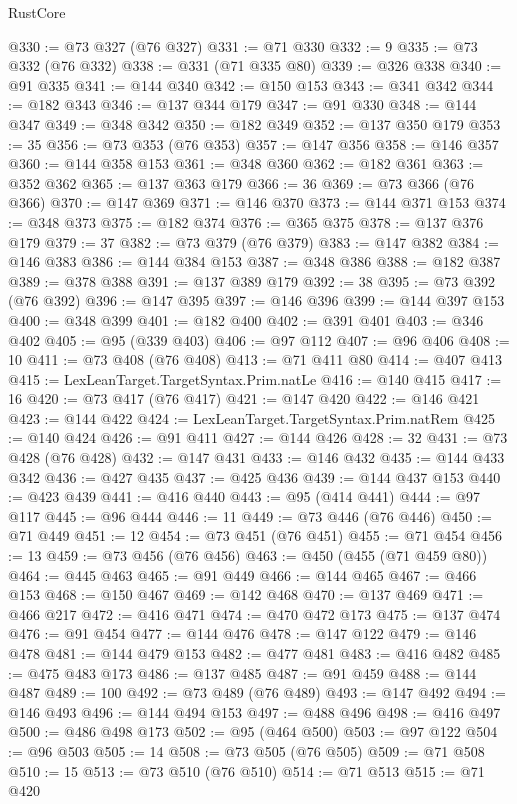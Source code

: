 \begin{lexlean}{RustCore}
\begin{coremodule}
@330 := @73 @327 (@76 @327)
@331 := @71 @330
@332 := 9
@335 := @73 @332 (@76 @332)
@338 := @331 (@71 @335 @80)
@339 := @326 @338
@340 := @91 @335
@341 := @144 @340
@342 := @150 @153
@343 := @341 @342
@344 := @182 @343
@346 := @137 @344 @179
@347 := @91 @330
@348 := @144 @347
@349 := @348 @342
@350 := @182 @349
@352 := @137 @350 @179
@353 := 35
@356 := @73 @353 (@76 @353)
@357 := @147 @356
@358 := @146 @357
@360 := @144 @358 @153
@361 := @348 @360
@362 := @182 @361
@363 := @352 @362
@365 := @137 @363 @179
@366 := 36
@369 := @73 @366 (@76 @366)
@370 := @147 @369
@371 := @146 @370
@373 := @144 @371 @153
@374 := @348 @373
@375 := @182 @374
@376 := @365 @375
@378 := @137 @376 @179
@379 := 37
@382 := @73 @379 (@76 @379)
@383 := @147 @382
@384 := @146 @383
@386 := @144 @384 @153
@387 := @348 @386
@388 := @182 @387
@389 := @378 @388
@391 := @137 @389 @179
@392 := 38
@395 := @73 @392 (@76 @392)
@396 := @147 @395
@397 := @146 @396
@399 := @144 @397 @153
@400 := @348 @399
@401 := @182 @400
@402 := @391 @401
@403 := @346 @402
@405 := @95 (@339 @403)
@406 := @97 @112
@407 := @96 @406
@408 := 10
@411 := @73 @408 (@76 @408)
@413 := @71 @411 @80
@414 := @407 @413
@415 := LexLeanTarget.TargetSyntax.Prim.natLe
@416 := @140 @415
@417 := 16
@420 := @73 @417 (@76 @417)
@421 := @147 @420
@422 := @146 @421
@423 := @144 @422
@424 := LexLeanTarget.TargetSyntax.Prim.natRem
@425 := @140 @424
@426 := @91 @411
@427 := @144 @426
@428 := 32
@431 := @73 @428 (@76 @428)
@432 := @147 @431
@433 := @146 @432
@435 := @144 @433 @342
@436 := @427 @435
@437 := @425 @436
@439 := @144 @437 @153
@440 := @423 @439
@441 := @416 @440
@443 := @95 (@414 @441)
@444 := @97 @117
@445 := @96 @444
@446 := 11
@449 := @73 @446 (@76 @446)
@450 := @71 @449
@451 := 12
@454 := @73 @451 (@76 @451)
@455 := @71 @454
@456 := 13
@459 := @73 @456 (@76 @456)
@463 := @450 (@455 (@71 @459 @80))
@464 := @445 @463
@465 := @91 @449
@466 := @144 @465
@467 := @466 @153
@468 := @150 @467
@469 := @142 @468
@470 := @137 @469
@471 := @466 @217
@472 := @416 @471
@474 := @470 @472 @173
@475 := @137 @474
@476 := @91 @454
@477 := @144 @476
@478 := @147 @122
@479 := @146 @478
@481 := @144 @479 @153
@482 := @477 @481
@483 := @416 @482
@485 := @475 @483 @173
@486 := @137 @485
@487 := @91 @459
@488 := @144 @487
@489 := 100
@492 := @73 @489 (@76 @489)
@493 := @147 @492
@494 := @146 @493
@496 := @144 @494 @153
@497 := @488 @496
@498 := @416 @497
@500 := @486 @498 @173
@502 := @95 (@464 @500)
@503 := @97 @122
@504 := @96 @503
@505 := 14
@508 := @73 @505 (@76 @505)
@509 := @71 @508
@510 := 15
@513 := @73 @510 (@76 @510)
@514 := @71 @513
@515 := @71 @420

\end{coremodule}
\end{lexlean}
